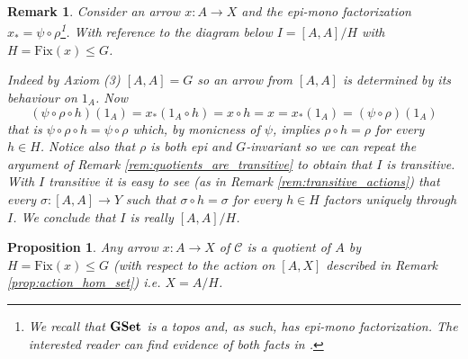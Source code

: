 \documentclass[italian, 12pt, reqno]{article}
\theoremstyle{myteo}
\newtheorem{proposition}[theorem]{Proposition}
\newtheorem{remark}[theorem]{Remark}
\numberwithin{equation}{section}
\newcommand{\cat}[1]{\mathscr{#1}}
\newcommand{\gset}{\text{\textbf{GSet}}}
\newcommand{\fix}[1]{\text{Fix}(#1)}
\newcommand{\homs}[2]{[#1, #2]}
\newcommand{\fun}[3]{#1\colon#2\to #3}
\begin{document}
\begin{remark}
  \label{rem:axiom2}
	Consider an arrow \(\fun{x}{A}{X}\) and the epi-mono factorization \(x_* = \psi\circ \rho\)\footnote{We recall that \(\gset\) is a topos and, as such, has epi-mono factorization. The interested reader can find evidence of both facts in \cite{topi}.}.
  With reference to the diagram below \(I = \homs{A}{A}/H\) with \(H = \fix{x}\leq G\).

  \begin{center}
  \end{center}

  Indeed by Axiom (3) \(\homs{A}{A} = G\) so an arrow from \(\homs{A}{A}\) is determined by its behaviour on \(1_A\).
  Now
  \[(\psi\circ\rho\circ h)(1_A) = x_*(1_A\circ h) = x\circ h = x = x_*(1_A) = (\psi\circ\rho)(1_A)\]
  that is \(\psi\circ\rho\circ h = \psi\circ\rho\) which, by monicness of \(\psi\), implies \(\rho\circ h = \rho\) for every \(h \in H\).
  Notice also that \(\rho\) is both epi and \(G\)-invariant so we can repeat the argument of Remark \ref{rem:quotients_are_transitive} to obtain that \(I\) is transitive.
  With \(I\) transitive it is easy to see (as in Remark \ref{rem:transitive_actions}) that every \(\sigma: [A, A] \to Y\) such that \(\sigma \circ h = \sigma\) for every \(h \in H\) factors uniquely through \(I\).
  We conclude that \(I\) is really \([A, A]/H\).
\end{remark}

\begin{proposition}
  \label{prop:epsilon_iso}
  Any arrow \(\fun{x}{A}{X}\) of \(\cat{C}\) is a quotient of \(A\) by \(H = \fix{x}\leq G\) (with respect to the action on \(\homs{A}{X}\) described in Remark \ref{prop:action_hom_set}) i.e. \(X = A/H\).
\end{proposition}
\end{document}
